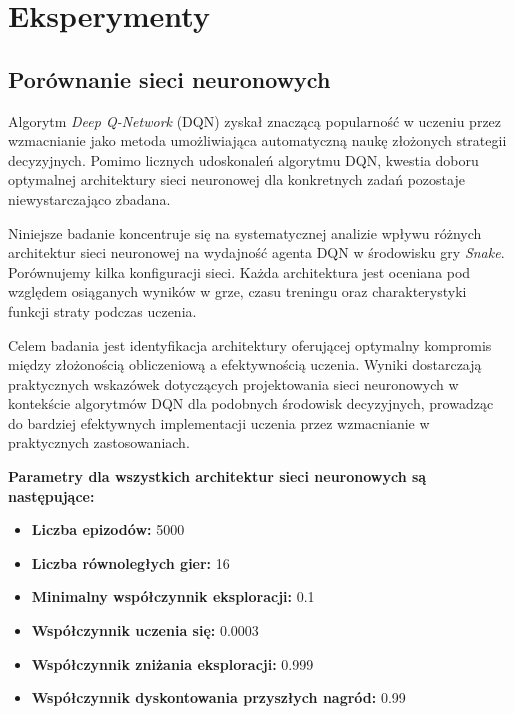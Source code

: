 \documentclass[a4paper,12pt]{article}
\begin{document}
\clearpage
  \section{Eksperymenty}

\subsection{Porównanie sieci neuronowych}

Algorytm \emph{Deep Q-Network} (DQN) zyskał znaczącą popularność w uczeniu przez wzmacnianie jako metoda umożliwiająca automatyczną naukę złożonych strategii decyzyjnych. Pomimo licznych udoskonaleń algorytmu DQN, kwestia doboru optymalnej architektury sieci neuronowej dla konkretnych zadań pozostaje niewystarczająco zbadana.

Niniejsze badanie koncentruje się na systematycznej analizie wpływu różnych architektur sieci neuronowej na wydajność agenta DQN w środowisku gry \emph{Snake}. Porównujemy kilka konfiguracji sieci. Każda architektura jest oceniana pod względem osiąganych wyników w grze, czasu treningu oraz charakterystyki funkcji straty podczas uczenia.


Celem badania jest identyfikacja architektury oferującej optymalny kompromis między złożonością obliczeniową a efektywnością uczenia. Wyniki dostarczają praktycznych wskazówek dotyczących projektowania sieci neuronowych w kontekście algorytmów DQN dla podobnych środowisk decyzyjnych, prowadząc do bardziej efektywnych implementacji uczenia przez wzmacnianie w praktycznych zastosowaniach.

\textbf{Parametry dla wszystkich architektur sieci neuronowych są następujące:}
\begin{itemize}
    \item \textbf{Liczba epizodów:} 5000
    \item \textbf{Liczba równoległych gier:} 16
    \item \textbf{Minimalny współczynnik eksploracji:} 0.1
    \item \textbf{Współczynnik uczenia się:} 0.0003
    \item \textbf{Współczynnik zniżania eksploracji:} 0.999
    \item  \textbf{Współczynnik dyskontowania przyszłych nagród:} 0.99
\end{itemize}
\end{document}
